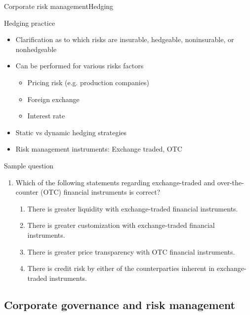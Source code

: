 \begin{frame}[allowframebreaks]{Corporate risk management}{Hedging}
	\begin{block}{Hedging practice}
		\begin{itemize}
			\item Clarification as to which risks are insurable, hedgeable, noninsurable,
			or nonhedgeable
			\item Can be performed for various risks factors
			\begin{itemize}
				\item Pricing risk (e.g. production companies)
				\item Foreign exchange
				\item Interest rate
			\end{itemize}
		    \item Static vs dynamic hedging strategies 
		    \item Risk management instruments: Exchange traded, OTC
		\end{itemize}
	\end{block}
\end{frame}


\begin{frame}{Sample question}

\begin{enumerate}
	\item Which of the following statements regarding exchange-traded and over-the-counter
	(OTC) financial instruments is correct?
	\begin{enumerate}[A]
		\item {\color{red} There is greater liquidity with exchange-traded financial instruments.}
		\item There is greater customization with exchange-traded financial instruments.
		\item There is greater price transparency with OTC financial instruments.
		\item There is credit risk by either of the counterparties inherent in exchange-traded instruments.
	\end{enumerate}
\end{enumerate}

\end{frame}

\subsection{Corporate governance and risk management}

